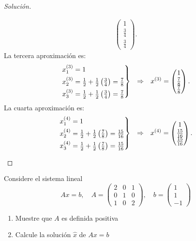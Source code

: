 \documentclass[12pt]{book}
\newenvironment{solucion}
  {\renewcommand\qedsymbol{$\square$}\begin{proof}[Solución]}
  {\end{proof}}
\begin{document}
\begin{solucion}
\begin{enumerate}
\begin{align*}
\begin{pmatrix}
    1\\
    \frac{3}{4}\\
    \frac{3}{4}
    \end{pmatrix}.
    \end{align*}
    La tercera aproximación es:
    \begin{align*}
        \begin{rcases*}
        x_1^{(3)}=1\\
    x_2^{(3)}=\frac{1}{2}+\frac{1}{2}\left(\frac{3}{4}\right)=\frac{7}{8}\\
    x_3^{(3)}=\frac{1}{2}+\frac{1}{2}\left(\frac{3}{4}\right)=\frac{7}{8}\end{rcases*} && \Rightarrow && x^{(3)}=\begin{pmatrix}
    1\\
    \frac{7}{8}\\
    \frac{7}{8}
    \end{pmatrix}.
    \end{align*}
    La cuarta aproximación es:
    \begin{align*}
        \begin{rcases*}
        x_1^{(4)}=1\\
    x_2^{(4)}=\frac{1}{2}+\frac{1}{2}\left(\frac{7}{8}\right)=\frac{15}{16}\\
    x_3^{(4)}=\frac{1}{2}+\frac{1}{2}\left(\frac{7}{8}\right)=\frac{15}{16}\end{rcases*} && \Rightarrow && x^{(4)}=\begin{pmatrix}
    1\\
    \frac{15}{16}\\
    \frac{15}{16}
    \end{pmatrix}.
    \end{align*}
\end{enumerate}
\end{solucion}

\eje Considere el sistema lineal
\[Ax=b,\quad
A=\begin{pmatrix}
2 & 0 & 1\\
0 & 1 & 0\\
1 & 0 & 2
\end{pmatrix},\quad
b=\begin{pmatrix}
1\\
1\\
-1
\end{pmatrix}\]
\begin{enumerate}
    \item Muestre que $A$ es definida positiva
    \item Calcule la solución $\hat{x}$ de $Ax=b$
\end{enumerate}
\end{document}
